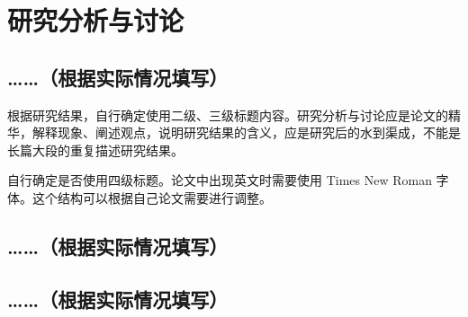 \chapter{研究分析与讨论}

\section{ ……（根据实际情况填写）}

根据研究结果，自行确定使用二级、三级标题内容。研究分析与讨论应是论文的精华，解释现象、阐述观点，说明研究结果的含义，应是研究后的水到渠成，不能是长篇大段的重复描述研究结果。

自行确定是否使用四级标题。论文中出现英文时需要使用 Times New Roman 字体。这个结构可以根据自己论文需要进行调整。

\section{……（根据实际情况填写）}

\section{……（根据实际情况填写）} 
